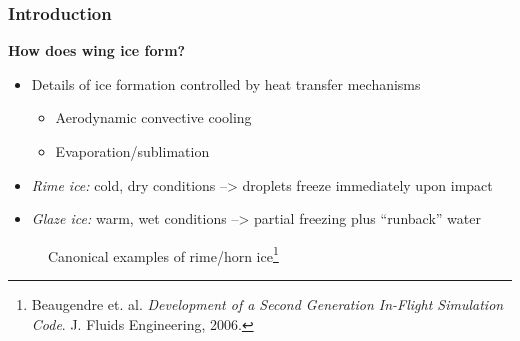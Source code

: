 \documentclass[9pt]{beamer}
\begin{document}
\begin{frame}
\frametitle{Introduction}
\label{sec-1-6}

\textbf{How does wing ice form?}
\begin{itemize}
\item Details of ice formation controlled by heat transfer mechanisms
\begin{itemize}
\item Aerodynamic convective cooling
\item Evaporation/sublimation
\end{itemize}
\item \emph{Rime ice:} cold, dry conditions --> droplets freeze immediately upon impact
\item \emph{Glaze ice:} warm, wet conditions --> partial freezing plus ``runback'' water
\end{itemize}

\vspace*{-0.4cm}\begin{figure} 
      \caption{Canonical examples of rime/horn ice\footnote{\tiny
      Beaugendre et. al. \emph{Development of a Second Generation
      In-Flight Simulation Code}. J. Fluids Engineering, 2006.}}
\end{figure}
\end{frame}
\end{document}
